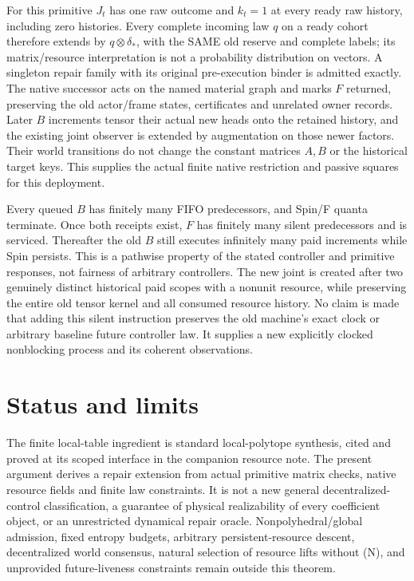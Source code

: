 \documentclass[11pt]{article}
\begin{document}
For this primitive $J_t$ has one raw outcome and $k_t=1$ at every ready raw history, including zero histories. Every complete incoming law $q$ on a ready cohort therefore extends by $q\otimes\delta_*$, with the SAME old reserve and complete labels; its matrix/resource interpretation is not a probability distribution on vectors. A singleton repair family with its original pre-execution binder is admitted exactly. The native successor acts on the named material graph and marks $F$ returned, preserving the old actor/frame states, certificates and unrelated owner records. Later $B$ increments tensor their actual new heads onto the retained history, and the existing joint observer is extended by augmentation on those newer factors. Their world transitions do not change the constant matrices $A,B$ or the historical target keys. This supplies the actual finite native restriction and passive squares for this deployment.

Every queued $B$ has finitely many FIFO predecessors, and Spin/F quanta terminate. Once both receipts exist, $F$ has finitely many silent predecessors and is serviced. Thereafter the old $B$ still executes infinitely many paid increments while Spin persists. This is a pathwise property of the stated controller and primitive responses, not fairness of arbitrary controllers. The new joint is created after two genuinely distinct historical paid scopes with a nonunit resource, while preserving the entire old tensor kernel and all consumed resource history. No claim is made that adding this silent instruction preserves the old machine's exact clock or arbitrary baseline future controller law. It supplies a new explicitly clocked nonblocking process and its coherent observations.

\section{Status and limits}
The finite local-table ingredient is standard local-polytope synthesis, cited and proved at its scoped interface in the companion resource note. The present argument derives a repair extension from actual primitive matrix checks, native resource fields and finite law constraints. It is not a new general decentralized-control classification, a guarantee of physical realizability of every coefficient object, or an unrestricted dynamical repair oracle. Nonpolyhedral/global admission, fixed entropy budgets, arbitrary persistent-resource descent, decentralized world consensus, natural selection of resource lifts without (N), and unprovided future-liveness constraints remain outside this theorem.
\end{document}
